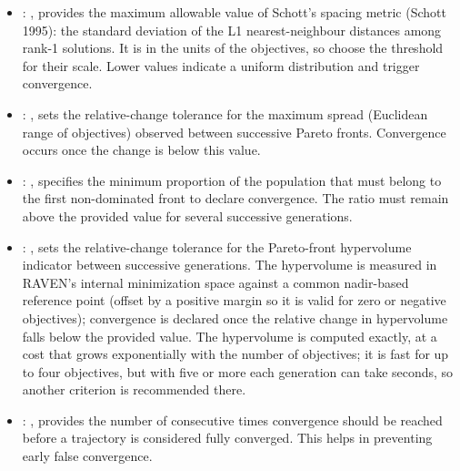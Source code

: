 \begin{itemize}
\begin{itemize}
        \item {}: ,
          provides the maximum allowable value of Schott's spacing metric (Schott 1995): the
          standard                        deviation of the L1 nearest-neighbour distances among
          rank-1 solutions. It is in the units                        of the objectives, so choose
          the threshold for their scale. Lower values indicate a uniform
          distribution and trigger convergence. 

        \item {}: ,
          sets the relative-change tolerance for the maximum spread (Euclidean range of objectives)
          observed between successive Pareto fronts. Convergence occurs once the change is below
          this value.

        \item {}: ,
          specifies the minimum proportion of the population that must belong to the first
          non-dominated front to declare convergence. The ratio must remain above the provided
          value for several successive generations.

        \item {}: ,
          sets the relative-change tolerance for the Pareto-front hypervolume indicator
          between successive generations. The hypervolume is measured in RAVEN's internal
          minimization space against a common nadir-based reference point (offset by a positive
          margin so it is valid for zero or negative objectives); convergence is declared once
          the relative change in hypervolume falls below the provided value. The hypervolume is
          computed exactly, at a cost that grows exponentially with the number of objectives; it is
          fast for up to four objectives, but with five or more each generation can take seconds,
          so another criterion is recommended there.

        \item {}: ,
          provides the number of consecutive times convergence should be reached before a trajectory
          is considered fully converged. This helps in preventing early false convergence.
      \end{itemize}


\end{itemize}
